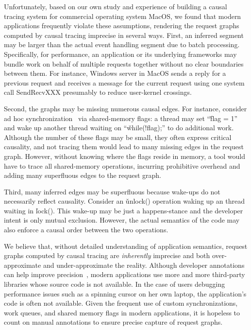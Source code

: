 Unfortunately, based on our own study and experience of building a causal
tracing system for commercial operating system MacOS, we found that modern
applications frequently violate these assumptions, rendering the request
graphs computed by causal tracing imprecise in several ways.  First, an
inferred segment may be larger than the actual event handling segment due
to batch processing.  Specifically, for performance, an application or its
underlying frameworks may bundle work on behalf of multiple requests
together without no clear boundaries between them.  For instance, Windows
server in MacOS sends a reply for a previous request and receives a
message for the current request using one system call SendRecvXXX
presumably to reduce user-kernel crossings.

Second, the graphs may be missing numerous causal edges.  For instance,
consider ad hoc synchronization~\cite{xxx} via shared-memory flags: a
thread may set ``\v{flag = 1}'' and wake up another thread waiting on
``\v{while(!flag);}'' to do additional work.  Although the number of these
flags may be small, they often express critical causality, and not tracing
them would lead to many missing edges in the request graph.  However,
without knowing where the flags reside in memory, a tool would have to
trace all shared-memory operations, incurring prohibitive overhead and
adding many superfluous edges to the request graph.

Third, many inferred edges may be superfluous because wake-ups do not
necessarily reflect causality.  Consider an \v{unlock()} operation waking
up an thread waiting in \v{lock()}.  This wake-up may be just a
happens-stance and the developer intent is only mutual exclusion.
However, the actual semantics of the code may also enforce a causal order
between the two operations.

We believe that, without detailed understanding of application semantics,
request graphs computed by causal tracing are \emph{inherently} imprecise
and both over-approximate and under-approximate the reality.  Although
developer annotations can help improve precision~\cite{}, modern
applications use more and more third-party libraries whose source code is
not available.  In the case of users debugging performance issues such as
a spinning cursor on her own laptop, the application's code is often not
available.  Given the frequent use of custom synchronizations, work
queues, and shared memory flags in modern applications, it is hopeless to
count on manual annotations to ensure precise capture of request graphs.

